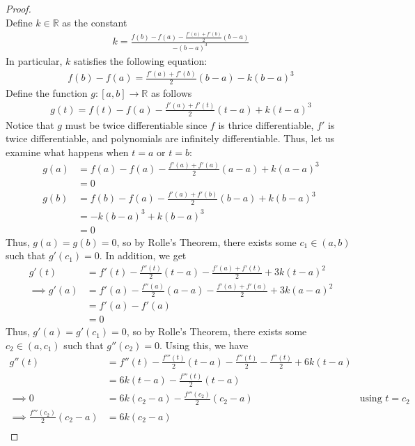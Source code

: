 \documentclass[10pt,a4paper]{article}
\theoremstyle{definition}
\theoremstyle{definition}
\numberwithin{equation}{section}
\begin{document}
\begin{proof}$ $
\\Define $k \in \mathbb{R}$ as the constant
\begin{align*}
k = \frac{f(b) - f(a) - \frac{f'(a) + f'(b)}{2}(b - a)}{-(b - a)^3}
\end{align*}
In particular, $k$ satisfies the following equation:
\begin{align*}
f(b) - f(a) = \frac{f'(a) + f'(b)}{2}(b - a) - k(b - a)^3
\end{align*}
Define the function $g: [a, b] \to \mathbb{R}$ as follows
\begin{align*}
g(t) = f(t) - f(a) - \frac{f'(a) + f'(t)}{2}(t - a) + k(t - a)^3
\end{align*}
Notice that $g$ must be twice differentiable since $f$ is thrice differentiable, $f'$ is twice differentiable, and polynomials are infinitely differentiable. Thus, let us examine what happens when $t = a$ or $t = b$:
\begin{align*}
g(a) &= f(a) - f(a) - \frac{f'(a) + f'(a)}{2}(a - a) + k(a - a)^3\\
&= 0\\
g(b) &= f(b) - f(a) - \frac{f'(a) + f'(b)}{2}(b - a) + k(b - a)^3\\
&= -k(b - a)^3 + k(b - a)^3\\
&= 0
\end{align*}
Thus, $g(a) = g(b) = 0$, so by Rolle's Theorem, there exists some $c_1 \in (a, b)$ such that $g'(c_1) = 0$. In addition, we get
\begin{align*}
g'(t) &= f'(t) - \frac{f''(t)}{2}(t - a) - \frac{f'(a) + f'(t)}{2} + 3k(t - a)^2\\
\implies g'(a) &= f'(a) - \frac{f''(a)}{2}(a - a) - \frac{f'(a) + f'(a)}{2} + 3k(a - a)^2\\
&= f'(a) - f'(a)\\
&= 0
\end{align*}
Thus, $g'(a) = g'(c_1) = 0$, so by Rolle's Theorem, there exists some $c_2 \in (a, c_1)$ such that $g''(c_2) = 0$. Using this, we have
\begin{align*}
g''(t) &= f''(t) - \frac{f'''(t)}{2}(t - a) - \frac{f''(t)}{2} - \frac{f''(t)}{2} + 6k(t - a)\\
&= 6k(t - a) - \frac{f'''(t)}{2}(t - a)\\
\implies 0 &= 6k(c_2 - a) - \frac{f'''(c_2)}{2}(c_2 - a) &\text{using $t = c_2$}\\
\implies \frac{f'''(c_2)}{2}(c_2 - a) &= 6k(c_2 - a)\\

\end{align*}
\end{proof}
\end{document}
